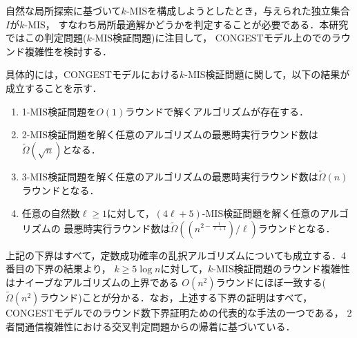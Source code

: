 \documentclass[11pt,a4paper]{jarticle}
\newcommand{\CONGEST}{\textsf{CONGEST}}
\theoremstyle{definition}
\begin{document}
自然な局所探索に基づいて$k$-MISを構成しようとしたとき，与えられた独立集合$I$が$k$-MIS，
すなわち局所最適解かどうかを判定することが必要である．本研究ではこの判定問題($k$-MIS検証問題)に注目して，
{\CONGEST}モデル上のでのラウンド複雑性を検討する．

具体的には，{\CONGEST}モデルにおける$k$-MIS検証問題に関して，以下の結果が成立することを示す．
\begin{enumerate}
\item 1-MIS検証問題を$O(1)$ラウンドで解くアルゴリズムが存在する．
\item 2-MIS検証問題を解く任意のアルゴリズムの最悪時実行ラウンド数は$\tilde{\Omega} (\sqrt{n})$となる．
\item 3-MIS検証問題を解く任意のアルゴリズムの最悪時実行ラウンド数は$\tilde{\Omega}(n)$ラウンドとなる．
\item 任意の自然数$\ell \geq 1$に対して，$(4\ell + 5)$-MIS検証問題を解く任意のアルゴリズムの
最悪時実行ラウンド数は$\tilde{\Omega}\left((n^{2 - \frac{1}{\ell+1}})/\ell\right)$ラウンドとなる．
\end{enumerate}

上記の下界はすべて，定数成功確率の乱択アルゴリズムについても成立する．4番目の下界の結果より，
$k\geq 5\log n$に対して，$k$-MIS検証問題のラウンド複雑性はナイーブなアルゴリズムの上界である
$O(n^2)$ラウンドにほぼ一致する($\tilde{\Omega}(n^2)$ラウンド)ことが分かる．なお，上述する下界の証明はすべて，
{\CONGEST}モデルでのラウンド数下界証明ための代表的な手法の一つである，
2者間通信複雑性における交叉判定問題からの帰着に基づいている．
\end{document}
